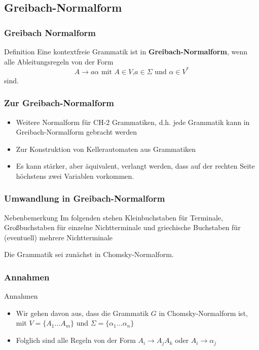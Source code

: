 

\subsection{Greibach-Normalform}
\begin{frame}
\frametitle{Greibach Normalform}
\begin{exampleblock}{Definition}
Eine kontextfreie Grammatik ist in \textbf{Greibach-Normalform}, wenn alle Ableitungsregeln von der Form 
$$ A \rightarrow a\alpha \text{ mit } A \in V\text{,} a\in \Sigma \text{ und } \alpha \in V^*$$
sind.
\end{exampleblock}
\end{frame}

\begin{frame}
\frametitle{Zur Greibach-Normalform}
\begin{itemize}
\item Weitere Normalform für CH-2 Grammatiken, d.h. jede Grammatik kann in Greibach-Normalform gebracht werden
\item Zur Konstruktion von Kellerautomaten aus Grammatiken
\item Es kann stärker, aber äquivalent, verlangt werden, dass auf der rechten Seite höchstens zwei Variablen vorkommen.
\end{itemize}
\end{frame}

\begin{frame}
\frametitle{Umwandlung in Greibach-Normalform}
\begin{exampleblock}{Nebenbemerkung}
Im folgenden stehen Kleinbuchstaben für Terminale, Großbuchstaben für einzelne Nichtterminale und griechische Buchstaben für (eventuell) mehrere Nichtterminale 
\end{exampleblock}
Die Grammatik sei zunächst in Chomsky-Normalform.
\end{frame}

\begin{frame}
\frametitle{Annahmen}
\begin{block}{Annahmen}
\begin{itemize}
 \item Wir gehen davon aus, dass die Grammatik $G$ in Chomsky-Normalform ist, mit $V = \{A_1 ... A_m \}$ und $\Sigma = \{\alpha_1 ... \alpha_n\}$
 \item Folglich sind alle Regeln von der Form $A_i \rightarrow A_jA_k$ oder $A_i \rightarrow \alpha_j$
\end{itemize}
\end{block}
\end{frame}

